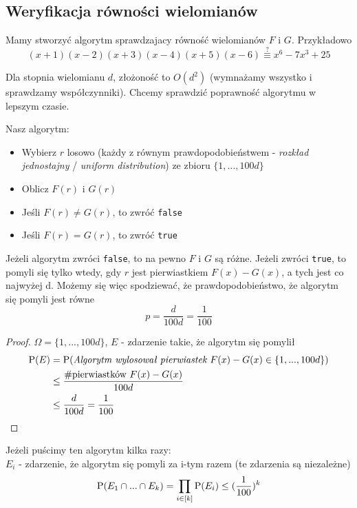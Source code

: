 \subsection{Weryfikacja równości wielomianów}
Mamy stworzyć algorytm sprawdzajacy równość wielomianów \(F\) i \(G\). Przykładowo \\
\[
	(x+1)(x-2)(x+3)(x-4)(x+5)(x-6) \overset{?}{\equiv} x^6 - 7x^3 + 25
\]

Dla stopnia wielomianu \(d\), złożoność to \(O(d^2)\) (wymnażamy wszystko i sprawdzamy współczynniki). Chcemy sprawdzić poprawność algorytmu w lepszym czasie.

Nasz algorytm:
\begin{itemize}
    \item Wybierz \(r\) losowo (każdy z równym prawdopodobieństwem - \textit{rozkład jednostajny} / \textit{uniform distribution}) ze zbioru \(\{1,...,100d\}\)
	\item Oblicz \(F(r)\) i \(G(r)\)
    \item Jeśli \(F(r) \neq G(r)\), to zwróć \texttt{false}
    \item Jeśli \(F(r) = G(r)\), to zwróć \texttt{true}
\end{itemize}

Jeżeli algorytm zwróci \texttt{false}, to na pewno \(F\) i \(G\) są różne. Jeżeli zwróci \texttt{true}, to pomyli się tylko wtedy, gdy \(r\) jest pierwiastkiem \(F(x) - G(x)\), a tych jest co najwyżej d. Możemy się więc spodziewać, że prawdopodobieństwo, że algorytm się pomyli jest równe
\[
	p = \frac{d}{100d} = \frac{1}{100}
\]

\begin{proof}
	\(\Omega = \{1,...,100d\}\), \(E\) - zdarzenie takie, że algorytm się pomylił
	\begin{align*}
		\operatorname{P}(E) &= \operatorname{P}(\textit{Algorytm wylosował pierwiastek $F(x) - G(x) \in \{1, ..., 100d\}$}) \\
		&\leq \frac{\#\text{pierwiastków } F(x) - G(x)}{100d} \\
		&\leq \frac{d}{100d} = \frac{1}{100}
	\end{align*}
\end{proof}

\noindent Jeżeli puścimy ten algorytm kilka razy: \\
\(E_i\) - zdarzenie, że algorytm się pomyli za i-tym razem (te zdarzenia są niezależne) \\
\[
	\operatorname{P}(E_1 \cap ... \cap E_k) = \prod_{i \in [k]}\operatorname{P}(E_i) \leq (\frac{1}{100})^k
\]



